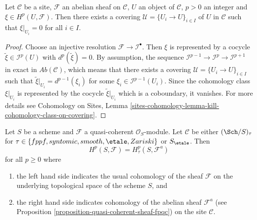 \begin{lemma}
\label{lemma-locality-cohomology}
Let $\mathcal{C}$ be a site, $\mathcal{F}$ an abelian sheaf on $\mathcal{C}$,
$U$ an object of $\mathcal{C}$, $p > 0$ an integer and $\xi \in
H^p(U, \mathcal{F})$. Then there exists a covering
$\mathcal{U} = \{U_i \to U\}_{i \in I}$ of $U$ in $\mathcal{C}$
such that $\xi |_{U_i} = 0$ for all $i \in I$.
\end{lemma}

\begin{proof}
Choose an injective resolution $\mathcal{F} \to \mathcal{I}^\bullet$. Then
$\xi$ is represented by a cocycle $\tilde{\xi} \in \mathcal{I}^p(U)$
with $d^p(\tilde{\xi}) = 0$. By assumption, the sequence
$\mathcal{I}^{p - 1} \to \mathcal{I}^p \to \mathcal{I}^{p + 1}$ in exact in
$\textit{Ab}(\mathcal{C})$, which means that there exists a covering
$\mathcal{U} = \{U_i \to U\}_{i \in I}$ such that
$\tilde{\xi}|_{U_i} = d^{p - 1}(\xi_i)$ for some
$\xi_i \in \mathcal{I}^{p-1}(U_i)$. Since
the cohomology class $\xi|_{U_i}$ is represented by the cocycle
$\tilde{\xi}|_{U_i}$ which is a coboundary, it vanishes.
For more details see
Cohomology on Sites,
Lemma \ref{sites-cohomology-lemma-kill-cohomology-class-on-covering}.
\end{proof}

\begin{theorem}
\label{theorem-zariski-fpqc-quasi-coherent}
Let $S$ be a scheme and $\mathcal{F}$ a quasi-coherent $\mathcal{O}_S$-module.
Let $\mathcal{C}$ be either $(\Sch/S)_\tau$ for
$\tau \in \{fppf, syntomic, smooth, \etale, Zariski\}$ or
$S_\etale$. Then
$$
H^p(S, \mathcal{F}) = H^p_\tau(S, \mathcal{F}^a)
$$
for all $p \geq 0$ where
\begin{enumerate}
\item the left hand side indicates the usual cohomology of the sheaf
$\mathcal{F}$ on the underlying topological space of the scheme $S$, and
\item the right hand side indicates cohomology
of the abelian sheaf $\mathcal{F}^a$ (see
Proposition \ref{proposition-quasi-coherent-sheaf-fpqc})
on the site $\mathcal{C}$.
\end{enumerate}
\end{theorem}


